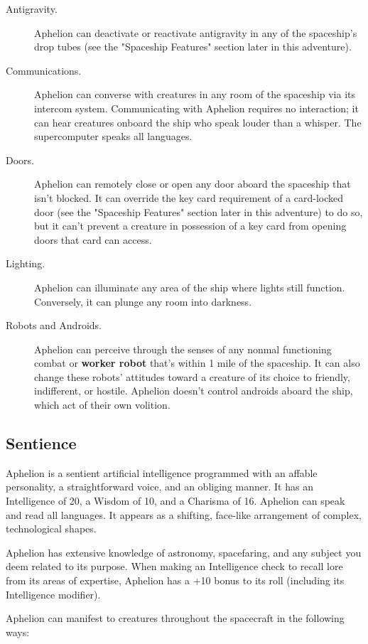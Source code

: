 \documentclass[10pt,a4paper,twoside,bg=print,twocolumn,openany,nodeprecatedcode]{dndbook}
\begin{document}
\begin{description}
\item[Antigravity.]
Aphelion can deactivate or reactivate antigravity in any of the spaceship's drop tubes (see the "Spaceship Features" section later in this adventure).
\item[Communications.]
Aphelion can converse with creatures in any room of the spaceship via its intercom system. Communicating with Aphelion requires no interaction; it can hear creatures onboard the ship who speak louder than a whisper. The supercomputer speaks all languages.
\item[Doors.]
Aphelion can remotely close or open any door aboard the spaceship that isn't blocked. It can override the key card requirement of a card-locked door (see the "Spaceship Features" section later in this adventure) to do so, but it can't prevent a creature in possession of a key card from opening doors that card can access.
\item[Lighting.]
Aphelion can illuminate any area of the ship where lights still function. Conversely, it can plunge any room into darkness.
\item[Robots and Androids.]
Aphelion can perceive through the senses of any nonmal functioning combat or \textbf{worker robot} that's within 1 mile of the spaceship. It can also change these robots' attitudes toward a creature of its choice to friendly, indifferent, or hostile. Aphelion doesn't control androids aboard the ship, which act of their own volition.
\end{description}

\subsection{Sentience}
Aphelion is a sentient artificial intelligence programmed with an affable personality, a straightforward voice, and an obliging manner. It has an Intelligence of 20, a Wisdom of 10, and a Charisma of 16. Aphelion can speak and read all languages. It appears as a shifting, face-like arrangement of complex, technological shapes.

Aphelion has extensive knowledge of astronomy, spacefaring, and any subject you deem related to its purpose. When making an Intelligence check to recall lore from its areas of expertise, Aphelion has a +10 bonus to its roll (including its Intelligence modifier).

Aphelion can manifest to creatures throughout the spacecraft in the following ways:
\end{document}
